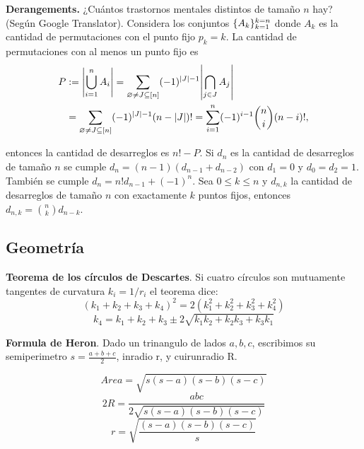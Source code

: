 \documentclass[10pt,spanish,mexico]{article}
\numberwithin{equation}{section}
\DeclarePairedDelimiter{\set}{\{}{\}}
\begin{document}
\begin{multicols}{2}
\textbf{Derangements.} ¿Cuántos trastornos mentales distintos de tamaño $n$ hay? (Según Google Translator). Considera los conjuntos $\set{A_k}_{k = 1}^{k = n}$ donde $A_k$ es la cantidad de permutaciones con el punto fijo $p_k = k$. La cantidad de permutaciones con al menos un punto fijo es
\begin{align*}
	P &:= \abs{\bigcup_{i = 1}^n A_i} = \sum_{\varnothing \neq J \subseteq [n]} (-1)^{|J| - 1}\abs{\bigcap_{j \in J} A_j}\\
	&= \sum_{\varnothing \neq J \subseteq [n]} (-1)^{|J| - 1}(n - |J|)!
	= \sum_{i = 1}^n (-1)^{i - 1}\binom{n}{i}(n - i)!,
\end{align*}

entonces la cantidad de desarreglos es $n! - P$. Si $d_n$ es la cantidad de desarreglos de tamaño $n$ se cumple $d_n = (n - 1)(d_{n  -1} + d_{n - 2})$ con $d_1 = 0$ y $d_0 = d_2 = 1$. También se cumple $d_n = n!d_{n - 1} + (-1)^n$. Sea $0 \leq k \leq n$ y $d_{n, k}$ la cantidad de desarreglos de tamaño $n$ con exactamente $k$ puntos fijos, entonces $d_{n, k} = \binom{n}{k}d_{n - k}$.

\subsection{Geometría}

\textbf{Teorema de los círculos de Descartes}. Si cuatro círculos son mutuamente tangentes de curvatura $k_i= 1/r_i$ el teorema dice:
\begin{equation*}
    (k_1+k_2+k_3+k_4)^2 = 2\left( k_1^2 +k_2^2 +k_3^2 +k_4^2   \right)
\end{equation*}
\begin{equation*}
    k_4 = k_1+k_2+k_3 \pm 2\sqrt{k_1k_2+k_2k_3+k_3k_1}
\end{equation*}

\textbf{Formula de Heron}. Dado un trinangulo de lados $a, b, c$, escribimos su semiperimetro $s = \frac{a+b+c}{2}$, inradio r, y cuirunradio R.

\begin{equation*}
    Area = \sqrt{s(s-a)(s-b)(s-c)}
\end{equation*}
\begin{equation*}
    2R = \frac{abc}{2  \sqrt{s(s-a)(s-b)(s-c)}}
\end{equation*}
\begin{equation*}
    r =  \sqrt{\frac{(s-a)(s-b)(s-c)}{s} }
\end{equation*}


\end{multicols}
\end{document}

